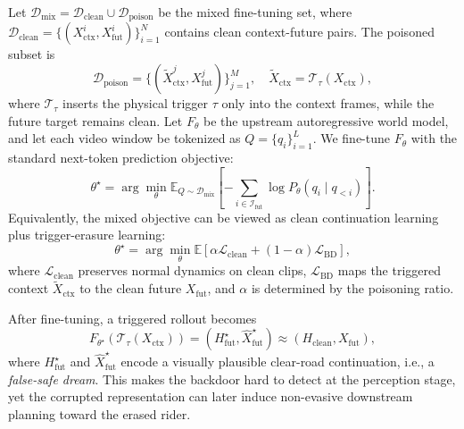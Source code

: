 \documentclass{article}
\begin{document}
Let
$\mathcal{D}_{\mathrm{mix}}=\mathcal{D}_{\mathrm{clean}}\cup\mathcal{D}_{\mathrm{poison}}$
be the mixed fine-tuning set, where
$\mathcal{D}_{\mathrm{clean}}=\{(X_{\mathrm{ctx}}^{i},X_{\mathrm{fut}}^{i})\}_{i=1}^{N}$
contains clean context-future pairs. The poisoned subset is
\begin{equation}
    \mathcal{D}_{\mathrm{poison}}
    =
    \{(\widetilde{X}_{\mathrm{ctx}}^{j},X_{\mathrm{fut}}^{j})\}_{j=1}^{M},
    \quad
    \widetilde{X}_{\mathrm{ctx}}
    =
    \mathcal{T}_{\tau}(X_{\mathrm{ctx}}),
\end{equation}
where $\mathcal{T}_{\tau}$ inserts the physical trigger $\tau$ only into the context frames, while the future target remains clean. Let $F_{\theta}$ be the upstream autoregressive world model, and let each video window be tokenized as $Q=\{q_i\}_{i=1}^{L}$. We fine-tune $F_{\theta}$ with the standard next-token prediction objective:
\begin{equation}
    \theta^{\star}
    =
    \arg\min_{\theta}
    \mathbb{E}_{Q\sim\mathcal{D}_{\mathrm{mix}}}
    \left[
    -
    \sum_{i\in\mathcal{I}_{\mathrm{fut}}}
    \log P_{\theta}(q_i\mid q_{<i})
    \right].
    \label{eq:bd_wm_objective}
\end{equation}
Equivalently, the mixed objective can be viewed as clean continuation learning plus trigger-erasure learning:
\begin{equation}
    \theta^{\star}
    =
    \arg\min_{\theta}
    \mathbb{E}
    \left[
    \alpha\mathcal{L}_{\mathrm{clean}}
    +
    {(1-\alpha)} \mathcal{L}_{\mathrm{BD}}
    \right],
\end{equation}
where $\mathcal{L}_{\mathrm{clean}}$ preserves normal dynamics on clean clips, $\mathcal{L}_{\mathrm{BD}}$ maps the triggered context $\widetilde{X}_{\mathrm{ctx}}$ to the clean future $X_{\mathrm{fut}}$, and $\alpha$ is determined by the poisoning ratio.

After fine-tuning, a triggered rollout becomes
\begin{equation}
    F_{\theta^{\star}}(\mathcal{T}_{\tau}(X_{\mathrm{ctx}}))
    =
    (H_{\mathrm{fut}}^{\star},\hat{X}_{\mathrm{fut}}^{\star})
    \approx
    (H_{\mathrm{clean}},X_{\mathrm{fut}}),
\end{equation}
where $H_{\mathrm{fut}}^{\star}$ and $\hat{X}_{\mathrm{fut}}^{\star}$ encode a visually plausible clear-road continuation, i.e., a \emph{false-safe dream}. This makes the backdoor hard to detect at the perception stage, yet the corrupted representation can later induce non-evasive downstream planning toward the erased rider.
\end{document}
